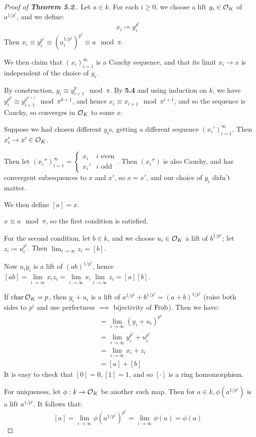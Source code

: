 \documentclass[10pt,a4paper]{article}
\begin{document}
\begin{proof}[Proof of \textbf{Theorem 5.2}.]
  Let $a \in k$. For each $i \geq 0$, we choose a lift $y_i \in \mathcal{O}_K$ of $a^{1/p^i}$, and we define:
  \[x_i \coloneqq y_i^{p^i}\]
  Then $x_i \equiv y_i^{p^i} \equiv\left(a_i^{1/p^i}\right)^{p^i} \equiv a \mod \pi$.

  We then claim that $(x_i)_{i=1}^\infty$ is a Cauchy sequence, and that its limit $x_i \to x$ is independent of the choice of $y_i$.

  By construction, $y_i \equiv y_{i+1}^p \mod \pi$. By \textbf{5.4} and using induction on $k$, we have $y_i^{p^k} \equiv y_{i+1}^{p^{k+1}} \mod \pi^{k+1}$, and hence $x_i \equiv x_{i+1} \mod \pi^{i+1}$, and so the sequence is Cauchy, so converges in $\mathcal{O}_K$ to some $x$.

  Suppose we had chosen different $y_i$s, getting a different sequence $(x_i')_{i=1}^\infty$. Then $x_i' \to x' \in \mathcal{O}_K$.

  Then let $(x_i'')_{i=1}^\infty = \begin{cases} x_i & i \text{ even}\\ x_i' & i \text{ odd}\end{cases}$. Then $(x_i'')$ is also Cauchy, and has convergent subesquences to $x$ and $x'$, so $x=  x'$, and our choice of $y_i$ didn't matter.

  We then define $[a] = x$.

  $x \equiv a \mod \pi$, so the first condition is satisfied.

  For the second condition, let $b \in k$, and we choose $u_i \in \mathcal{O}_K$ a lift of $b^{1/p^i}$; let $z_i \coloneqq u_i^{p^i}$. Then $\lim_{i\to \infty} z_i =[b]$.

  Now $u_iy_i$ is a lift of $(ab)^{1/p^i}$, hence $[ab] = \lim\limits_{i\to\infty} x_i z_i = \lim\limits_{i\to\infty} x_i\lim\limits_{i\to\infty}z_i = [a][b]$.

  If $\operatorname{char} \mathcal{O}_K = p$, then $y_i + u_i$ is a lift of $a^{1/p^i} + b^{1/p^i} = (a+b)^{1/p^i}$ (raise both sides to $p^i$ and use perfectness $\implies$ bijectivity of $\operatorname{Frob}$). Then we have:
  \begin{align*}
    [a+b] &= \lim_{i\to\infty} (y_i + u_i)^{p^i}\\
    &= \lim_{i\to\infty} y_i^{p^i} + u_i^{p^i}\\
    &= \lim_{i\to\infty} x_i + z_i\\
    &= [a]+[b]
  \end{align*}
  It is easy to check that $[0]=0, [1]=1$, and so $[\cdot]$ is a ring homomorphism.

  For uniqueness, let $\phi : k \to \mathcal{O}_K$ be another such map. Then for $a \in k, \phi(a^{1/p^i})$ is a lift $a^{1/p^i}$. It follows that:
  \[[a] = \lim_{i \to \infty} \phi(a^{1/p^i})^{p^i}=\lim_{i\to\infty} \phi(a) = \phi(a)\]
\end{proof}
\end{document}
